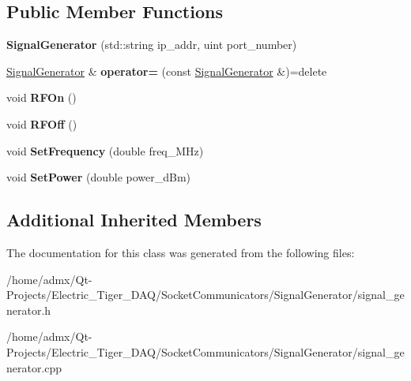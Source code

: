 \subsection*{Public Member Functions}
\begin{DoxyCompactItemize}
\item 
\hypertarget{class_signal_generator_a8e6b4d36b320d50961f83761c5811567}{{\bfseries Signal\+Generator} (std\+::string ip\+\_\+addr, uint port\+\_\+number)}\label{class_signal_generator_a8e6b4d36b320d50961f83761c5811567}

\item 
\hypertarget{class_signal_generator_a4ee427365a76d62d3645f707cf1baf72}{\hyperlink{class_signal_generator}{Signal\+Generator} \& {\bfseries operator=} (const \hyperlink{class_signal_generator}{Signal\+Generator} \&)=delete}\label{class_signal_generator_a4ee427365a76d62d3645f707cf1baf72}

\item 
\hypertarget{class_signal_generator_a55fbb51b7bd6b3cef69689eb8a63f0f9}{void {\bfseries R\+F\+On} ()}\label{class_signal_generator_a55fbb51b7bd6b3cef69689eb8a63f0f9}

\item 
\hypertarget{class_signal_generator_a2f277765a848fe7640fae5b3d79c1714}{void {\bfseries R\+F\+Off} ()}\label{class_signal_generator_a2f277765a848fe7640fae5b3d79c1714}

\item 
\hypertarget{class_signal_generator_a9ad69641992a00ef027682d5391df8e8}{void {\bfseries Set\+Frequency} (double freq\+\_\+\+M\+Hz)}\label{class_signal_generator_a9ad69641992a00ef027682d5391df8e8}

\item 
\hypertarget{class_signal_generator_a319e0ca196dd341b1aab276626a729f3}{void {\bfseries Set\+Power} (double power\+\_\+d\+Bm)}\label{class_signal_generator_a319e0ca196dd341b1aab276626a729f3}

\end{DoxyCompactItemize}
\subsection*{Additional Inherited Members}


The documentation for this class was generated from the following files\+:\begin{DoxyCompactItemize}
\item 
/home/admx/\+Qt-\/\+Projects/\+Electric\+\_\+\+Tiger\+\_\+\+D\+A\+Q/\+Socket\+Communicators/\+Signal\+Generator/signal\+\_\+generator.\+h\item 
/home/admx/\+Qt-\/\+Projects/\+Electric\+\_\+\+Tiger\+\_\+\+D\+A\+Q/\+Socket\+Communicators/\+Signal\+Generator/signal\+\_\+generator.\+cpp\end{DoxyCompactItemize}
